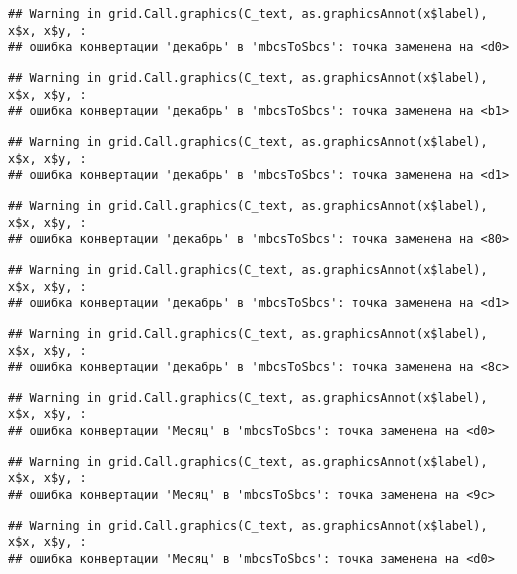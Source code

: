 \documentclass[
]{article}
\begin{document}
\begin{verbatim}
## Warning in grid.Call.graphics(C_text, as.graphicsAnnot(x$label), x$x, x$y, :
## ошибка конвертации 'декабрь' в 'mbcsToSbcs': точка заменена на <d0>
\end{verbatim}

\begin{verbatim}
## Warning in grid.Call.graphics(C_text, as.graphicsAnnot(x$label), x$x, x$y, :
## ошибка конвертации 'декабрь' в 'mbcsToSbcs': точка заменена на <b1>
\end{verbatim}

\begin{verbatim}
## Warning in grid.Call.graphics(C_text, as.graphicsAnnot(x$label), x$x, x$y, :
## ошибка конвертации 'декабрь' в 'mbcsToSbcs': точка заменена на <d1>
\end{verbatim}

\begin{verbatim}
## Warning in grid.Call.graphics(C_text, as.graphicsAnnot(x$label), x$x, x$y, :
## ошибка конвертации 'декабрь' в 'mbcsToSbcs': точка заменена на <80>
\end{verbatim}

\begin{verbatim}
## Warning in grid.Call.graphics(C_text, as.graphicsAnnot(x$label), x$x, x$y, :
## ошибка конвертации 'декабрь' в 'mbcsToSbcs': точка заменена на <d1>
\end{verbatim}

\begin{verbatim}
## Warning in grid.Call.graphics(C_text, as.graphicsAnnot(x$label), x$x, x$y, :
## ошибка конвертации 'декабрь' в 'mbcsToSbcs': точка заменена на <8c>
\end{verbatim}

\begin{verbatim}
## Warning in grid.Call.graphics(C_text, as.graphicsAnnot(x$label), x$x, x$y, :
## ошибка конвертации 'Месяц' в 'mbcsToSbcs': точка заменена на <d0>
\end{verbatim}

\begin{verbatim}
## Warning in grid.Call.graphics(C_text, as.graphicsAnnot(x$label), x$x, x$y, :
## ошибка конвертации 'Месяц' в 'mbcsToSbcs': точка заменена на <9c>
\end{verbatim}

\begin{verbatim}
## Warning in grid.Call.graphics(C_text, as.graphicsAnnot(x$label), x$x, x$y, :
## ошибка конвертации 'Месяц' в 'mbcsToSbcs': точка заменена на <d0>
\end{verbatim}
\end{document}
